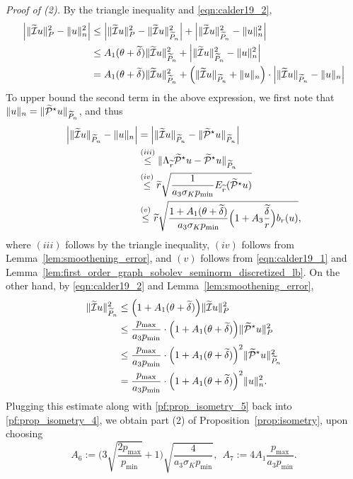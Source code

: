 \textit{Proof of (2).}
By the triangle inequality and \eqref{eqn:calder19_2},
\begin{align}
\Bigl|\|\widetilde{\mathcal{I}}u\|_{P}^2 - \|u\|_{n}^2\Bigr| & \leq \Bigl|\|\widetilde{\mathcal{I}}u\|_{P}^2 - \|\widetilde{\mathcal{I}}u\|_{\widetilde{P}_n}^2\Bigr| + \Bigl|\|\widetilde{\mathcal{I}}u\|_{\widetilde{P}_n}^2 - \|u\|_{n}^2\Bigr| \nonumber \\
& \leq A_1(\theta + \widetilde{\delta}) \|\widetilde{\mathcal{I}}u\|_{\widetilde{P}_n}^2 + \Bigl|\|\widetilde{\mathcal{I}}u\|_{\widetilde{P}_n}^2 - \|u\|_{n}^2\Bigr| \nonumber\\
& = A_1(\theta + \widetilde{\delta}) \|\widetilde{\mathcal{I}}u\|_{\widetilde{P}_n}^2 + \Bigl(\|\widetilde{\mathcal{I}}u\|_{\widetilde{P}_n} + \|u\|_{n}\Bigr) \cdot \Bigl|\|\widetilde{\mathcal{I}}u\|_{\widetilde{P}_n} - \|u\|_{n}\Bigr| \label{pf:prop_isometry_4}
\end{align}
To upper bound the second term in the above expression, we first note that~$\|u\|_{n} = \|\widetilde{\mathcal{P}}^{\star}u\|_{\widetilde{P}_n}$, and thus
\begin{align}
\Bigl|\|\widetilde{\mathcal{I}}u\|_{\widetilde{P}_n} - \|u\|_{n} \Bigr| & = \Bigl|\|\widetilde{\mathcal{I}}u\|_{\widetilde{P}_n} - \|\widetilde{\mathcal{P}}^{\star}u\|_{\widetilde{P}_n}\Bigr| \nonumber \\
& \overset{(iii)}{\leq} \|\Lambda_{\widetilde{r}}\widetilde{\mathcal{P}}^{\star}u - \widetilde{\mathcal{P}}^{\star}u\|_{\widetilde{P}_n} \nonumber \\
& \overset{(iv)}{\leq} \widetilde{r} \sqrt{\frac{1}{a_3\sigma_K p_{\min}} E_{\widetilde{r}}(\widetilde{\mathcal{P}}^{\star}u)} \nonumber \\
& \overset{(v)}{\leq} \widetilde{r} \sqrt{\frac{1 + A_1(\theta + \widetilde{\delta})}{a_3\sigma_K p_{\min}} \Bigl(1 + A_3\frac{\widetilde{\delta}}{r}\Bigr) b_r(u)},\label{pf:prop_isometry_5}
\end{align}
where $(iii)$ follows by the triangle inequality, $(iv)$ follows from Lemma~\ref{lem:smoothening_error}, and $(v)$ follows from \eqref{eqn:calder19_1} and Lemma~\ref{lem:first_order_graph_sobolev_seminorm_discretized_lb}. On the other hand, by \eqref{eqn:calder19_2} and Lemma~\ref{lem:smoothening_error},
\begin{align*}
\|\widetilde{\mathcal{I}}u\|_{\widetilde{P}_n}^2 & \leq \Bigl(1 + A_1(\theta + \widetilde{\delta})\Bigr) \|\widetilde{\mathcal{I}}u\|_{P}^2 \\
& \leq \frac{p_{\max}}{a_3p_{\min}} \cdot \Bigl(1 + A_1(\theta + \widetilde{\delta})\Bigr) \|\widetilde{\mathcal{P}}^{\star}u\|_{P}^2 \\
& \leq \frac{p_{\max}}{a_3p_{\min}} \cdot \Bigl(1 + A_1(\theta + \widetilde{\delta})\Bigr)^2 \|\widetilde{\mathcal{P}}^{\star}u\|_{\widetilde{P}_n}^2 \\
& = \frac{p_{\max}}{a_3p_{\min}} \cdot \Bigl(1 + A_1(\theta + \widetilde{\delta})\Bigr)^2 \|u\|_{n}^2.
\end{align*}
Plugging this estimate along with \eqref{pf:prop_isometry_5} back into \eqref{pf:prop_isometry_4}, we obtain part (2) of Proposition~\ref{prop:isometry}, upon choosing
\begin{equation*}
A_6 := \biggl(3\sqrt{\frac{2p_{\max}}{p_{\min}}} + 1\biggr)\sqrt{\frac{4}{a_3\sigma_Kp_{\min}}},~~A_7:=4A_1\frac{p_{\max}}{a_3p_{\min}}.
\end{equation*}

